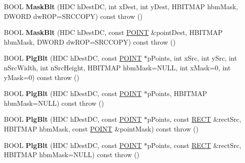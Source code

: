\begin{DoxyCompactItemize}
\item 
\mbox{\label{class_a_t_l_1_1_c_image_a0f3f5761bf5da9758727de675b32f4aa}} 
B\+O\+OL {\bfseries Mask\+Blt} (H\+DC h\+Dest\+DC, int x\+Dest, int y\+Dest, H\+B\+I\+T\+M\+AP hbm\+Mask, D\+W\+O\+RD dw\+R\+OP=S\+R\+C\+C\+O\+PY) const  throw ()
\item 
\mbox{\label{class_a_t_l_1_1_c_image_a106a35efe68e98fa8d1207f1221b1f14}} 
B\+O\+OL {\bfseries Mask\+Blt} (H\+DC h\+Dest\+DC, const \hyperlink{structtag_p_o_i_n_t}{P\+O\+I\+NT} \&point\+Dest, H\+B\+I\+T\+M\+AP hbm\+Mask, D\+W\+O\+RD dw\+R\+OP=S\+R\+C\+C\+O\+PY) const  throw ()
\item 
\mbox{\label{class_a_t_l_1_1_c_image_aa47ccfebb16a29d55b893765fed9f7a5}} 
B\+O\+OL {\bfseries Plg\+Blt} (H\+DC h\+Dest\+DC, const \hyperlink{structtag_p_o_i_n_t}{P\+O\+I\+NT} $\ast$p\+Points, int x\+Src, int y\+Src, int n\+Src\+Width, int n\+Src\+Height, H\+B\+I\+T\+M\+AP hbm\+Mask=N\+U\+LL, int x\+Mask=0, int y\+Mask=0) const  throw ()
\item 
\mbox{\label{class_a_t_l_1_1_c_image_ab49f9e8370619b9b022f7e1118604948}} 
B\+O\+OL {\bfseries Plg\+Blt} (H\+DC h\+Dest\+DC, const \hyperlink{structtag_p_o_i_n_t}{P\+O\+I\+NT} $\ast$p\+Points, H\+B\+I\+T\+M\+AP hbm\+Mask=N\+U\+LL) const  throw ()
\item 
\mbox{\label{class_a_t_l_1_1_c_image_aac87b2675fa63cced75b2f6fc2bfd93b}} 
B\+O\+OL {\bfseries Plg\+Blt} (H\+DC h\+Dest\+DC, const \hyperlink{structtag_p_o_i_n_t}{P\+O\+I\+NT} $\ast$p\+Points, const \hyperlink{structtag_r_e_c_t}{R\+E\+CT} \&rect\+Src, H\+B\+I\+T\+M\+AP hbm\+Mask, const \hyperlink{structtag_p_o_i_n_t}{P\+O\+I\+NT} \&point\+Mask) const  throw ()
\item 
\mbox{\label{class_a_t_l_1_1_c_image_aef78f4da3045bb30d8a0c5dcf0ce5722}} 
B\+O\+OL {\bfseries Plg\+Blt} (H\+DC h\+Dest\+DC, const \hyperlink{structtag_p_o_i_n_t}{P\+O\+I\+NT} $\ast$p\+Points, const \hyperlink{structtag_r_e_c_t}{R\+E\+CT} \&rect\+Src, H\+B\+I\+T\+M\+AP hbm\+Mask=N\+U\+LL) const  throw ()
\item 
\mbox{\label{class_a_t_l_1_1_c_image_ac97a85823be20e174b20b5fcac42e4c7}} 

\end{DoxyCompactItemize}
